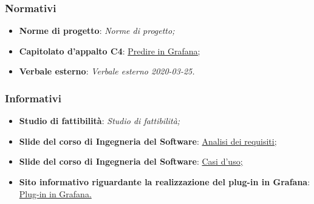 \documentclass[../analisi-dei-requisiti.tex]{subfiles}
\begin{document}
\subsubsection{Normativi}%
\label{subs:normativi}

\begin{itemize}
  \item \textbf{Norme di progetto}: \textit{Norme di progetto;}
  \item \textbf{Capitolato d'appalto C4}: \href{https://www.math.unipd.it/~tullio/IS-1/2019/Progetto/C4.pdf}{Predire in Grafana;}
  \item \textbf{Verbale esterno}: \textit{Verbale esterno 2020-03-25.}
\end{itemize}

\subsubsection{Informativi}%
\label{subs:informativi}

\begin{itemize}
  \item \textbf{Studio di fattibilità}: \textit{Studio di fattibilità;}
  \item \textbf{Slide del corso di Ingegneria del Software}: \href{https://www.math.unipd.it/~tullio/IS-1/2019/Dispense/L08.pdf}{Analisi dei requisiti;}
  \item \textbf{Slide del corso di Ingegneria del Software}: \href{https://www.math.unipd.it/~tullio/IS-1/2019/Dispense/E03.pdf}{Casi d'uso;}
  \item \textbf{Sito informativo riguardante la realizzazione del plug-in in Grafana}: \href{https://grafana.com/docs/grafana/latest/plugins/}{Plug-in in Grafana.}
\end{itemize}
\end{document}
